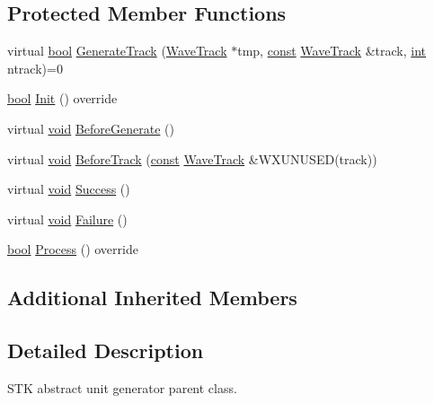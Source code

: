\subsection*{Protected Member Functions}
\begin{DoxyCompactItemize}
\item 
virtual \hyperlink{mac_2config_2i386_2lib-src_2libsoxr_2soxr-config_8h_abb452686968e48b67397da5f97445f5b}{bool} \hyperlink{class_generator_a822be35058daba6bb64335d7a1f8cd23}{Generate\+Track} (\hyperlink{class_wave_track}{Wave\+Track} $\ast$tmp, \hyperlink{getopt1_8c_a2c212835823e3c54a8ab6d95c652660e}{const} \hyperlink{class_wave_track}{Wave\+Track} \&track, \hyperlink{xmltok_8h_a5a0d4a5641ce434f1d23533f2b2e6653}{int} ntrack)=0
\item 
\hyperlink{mac_2config_2i386_2lib-src_2libsoxr_2soxr-config_8h_abb452686968e48b67397da5f97445f5b}{bool} \hyperlink{class_generator_a713fe54dff8a2e1a0ca62845f98746e7}{Init} () override
\item 
virtual \hyperlink{sound_8c_ae35f5844602719cf66324f4de2a658b3}{void} \hyperlink{class_generator_a823c2f5d3b3dd3d26d4b4828947736c2}{Before\+Generate} ()
\item 
virtual \hyperlink{sound_8c_ae35f5844602719cf66324f4de2a658b3}{void} \hyperlink{class_generator_a2216c8ab484e5316a71bf2e197584020}{Before\+Track} (\hyperlink{getopt1_8c_a2c212835823e3c54a8ab6d95c652660e}{const} \hyperlink{class_wave_track}{Wave\+Track} \&W\+X\+U\+N\+U\+S\+ED(track))
\item 
virtual \hyperlink{sound_8c_ae35f5844602719cf66324f4de2a658b3}{void} \hyperlink{class_generator_ab826e8497e3411b43434a620f2a11222}{Success} ()
\item 
virtual \hyperlink{sound_8c_ae35f5844602719cf66324f4de2a658b3}{void} \hyperlink{class_generator_aa2cdf1937329437961f2714695862e84}{Failure} ()
\item 
\hyperlink{mac_2config_2i386_2lib-src_2libsoxr_2soxr-config_8h_abb452686968e48b67397da5f97445f5b}{bool} \hyperlink{class_generator_aa14b74a30de5adece1b8d233cadd2ec3}{Process} () override
\end{DoxyCompactItemize}
\subsection*{Additional Inherited Members}


\subsection{Detailed Description}
S\+TK abstract unit generator parent class. 

